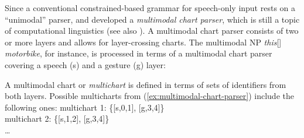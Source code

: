\documentclass[output=paper
                ,modfonts
                ,nonflat
	        ,collection
	        ,collectionchapter
	        ,collectiontoclongg
 	        ,biblatex
                ,babelshorthands
                ,newtxmath
                ,draftmode
                ,colorlinks, citecolor=brown
]{./langsci/langscibook}
\begin{document}
Since a conventional constrained-based grammar for speech-only input rests on a \enquote{unimodal} parser, \citet{Johnston:1998} and \citet{Johnston:et:al:1997} developed a \emph{multimodal chart parser}, which is still a topic of computational linguistics \citep{Alahverdzhieva:Flickinger:Lascarides:2012} (see also ).
%
A multimodal chart parser consists of two or more layers and allows for layer-crossing charts.
%
The multimodal NP \emph{this}[\Pointing] \emph{motorbike}, for instance, is processed in terms of a multimodal chart parser covering a speech (s) and a gesture (g) layer:
%
\ea \label{ex:multimodal-chart-parser}
\z

A multimodal chart or \emph{multichart}  is defined in terms of sets of identifiers from both layers.
%
Possible multicharts from (\ref{ex:multimodal-chart-parser}) include the following ones:
%
\ea
multichart 1: \{[s,0,1], [g,3,4]\} \\
multichart 2: \{[s,1,2], [g,3,4]\} \\
\ldots
\z
{}

\end{document}
